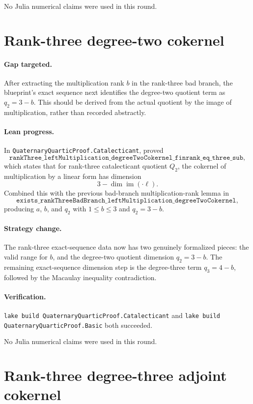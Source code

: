 \documentclass[11pt]{article}
\begin{document}
No Julia numerical claims were used in this round.

\section*{Rank-three degree-two cokernel}

\paragraph{Gap targeted.}
After extracting the multiplication rank \(b\) in the rank-three bad branch,
the blueprint's exact sequence next identifies the degree-two quotient term as
\(q_2=3-b\).  This should be derived from the actual quotient by the image of
multiplication, rather than recorded abstractly.

\paragraph{Lean progress.}
In \texttt{QuaternaryQuarticProof.Catalecticant}, proved
\[
\texttt{rankThree\_leftMultiplication\_degreeTwoCokernel\_finrank\_eq\_three\_sub},
\]
which states that for rank-three catalecticant quotient \(Q_2\), the cokernel
of multiplication by a linear form has dimension
\[
3-\dim\operatorname{im}(\cdot \ell).
\]
Combined this with the previous bad-branch multiplication-rank lemma in
\[
\texttt{exists\_rankThreeBadBranch\_leftMultiplication\_degreeTwoCokernel},
\]
producing \(a\), \(b\), and \(q_2\) with \(1\le b\le3\) and \(q_2=3-b\).

\paragraph{Strategy change.}
The rank-three exact-sequence data now has two genuinely formalized pieces:
the valid range for \(b\), and the degree-two quotient dimension \(q_2=3-b\).
The remaining exact-sequence dimension step is the degree-three term
\(q_3=4-b\), followed by the Macaulay inequality contradiction.

\paragraph{Verification.}
\texttt{lake build QuaternaryQuarticProof.Catalecticant} and
\texttt{lake build QuaternaryQuarticProof.Basic} both succeeded.

No Julia numerical claims were used in this round.

\section*{Rank-three degree-three adjoint cokernel}
\end{document}
